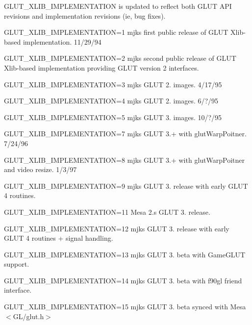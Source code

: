 G\+L\+U\+T\+\_\+\+X\+L\+I\+B\+\_\+\+I\+M\+P\+L\+E\+M\+E\+N\+T\+A\+T\+I\+ON is updated to reflect both G\+L\+UT A\+PI revisions and implementation revisions (ie, bug fixes).

G\+L\+U\+T\+\_\+\+X\+L\+I\+B\+\_\+\+I\+M\+P\+L\+E\+M\+E\+N\+T\+A\+T\+I\+ON=1 mjk\textquotesingle{}s first public release of G\+L\+UT Xlib-\/based implementation. 11/29/94

G\+L\+U\+T\+\_\+\+X\+L\+I\+B\+\_\+\+I\+M\+P\+L\+E\+M\+E\+N\+T\+A\+T\+I\+ON=2 mjk\textquotesingle{}s second public release of G\+L\+UT Xlib-\/based implementation providing G\+L\+UT version 2 interfaces.

G\+L\+U\+T\+\_\+\+X\+L\+I\+B\+\_\+\+I\+M\+P\+L\+E\+M\+E\+N\+T\+A\+T\+I\+ON=3 mjk\textquotesingle{}s G\+L\+UT 2. images. 4/17/95

G\+L\+U\+T\+\_\+\+X\+L\+I\+B\+\_\+\+I\+M\+P\+L\+E\+M\+E\+N\+T\+A\+T\+I\+ON=4 mjk\textquotesingle{}s G\+L\+UT 2. images. 6/?/95

G\+L\+U\+T\+\_\+\+X\+L\+I\+B\+\_\+\+I\+M\+P\+L\+E\+M\+E\+N\+T\+A\+T\+I\+ON=5 mjk\textquotesingle{}s G\+L\+UT 3. images. 10/?/95

G\+L\+U\+T\+\_\+\+X\+L\+I\+B\+\_\+\+I\+M\+P\+L\+E\+M\+E\+N\+T\+A\+T\+I\+ON=7 mjk\textquotesingle{}s G\+L\+UT 3.+ with glut\+Warp\+Poitner. 7/24/96

G\+L\+U\+T\+\_\+\+X\+L\+I\+B\+\_\+\+I\+M\+P\+L\+E\+M\+E\+N\+T\+A\+T\+I\+ON=8 mjk\textquotesingle{}s G\+L\+UT 3.+ with glut\+Warp\+Poitner and video resize. 1/3/97

G\+L\+U\+T\+\_\+\+X\+L\+I\+B\+\_\+\+I\+M\+P\+L\+E\+M\+E\+N\+T\+A\+T\+I\+ON=9 mjk\textquotesingle{}s G\+L\+UT 3. release with early G\+L\+UT 4 routines.

G\+L\+U\+T\+\_\+\+X\+L\+I\+B\+\_\+\+I\+M\+P\+L\+E\+M\+E\+N\+T\+A\+T\+I\+ON=11 Mesa 2.\textquotesingle{}s G\+L\+UT 3. release.

G\+L\+U\+T\+\_\+\+X\+L\+I\+B\+\_\+\+I\+M\+P\+L\+E\+M\+E\+N\+T\+A\+T\+I\+ON=12 mjk\textquotesingle{}s G\+L\+UT 3. release with early G\+L\+UT 4 routines + signal handling.

G\+L\+U\+T\+\_\+\+X\+L\+I\+B\+\_\+\+I\+M\+P\+L\+E\+M\+E\+N\+T\+A\+T\+I\+ON=13 mjk\textquotesingle{}s G\+L\+UT 3. beta with Game\+G\+L\+UT support.

G\+L\+U\+T\+\_\+\+X\+L\+I\+B\+\_\+\+I\+M\+P\+L\+E\+M\+E\+N\+T\+A\+T\+I\+ON=14 mjk\textquotesingle{}s G\+L\+UT 3. beta with f90gl friend interface.

G\+L\+U\+T\+\_\+\+X\+L\+I\+B\+\_\+\+I\+M\+P\+L\+E\+M\+E\+N\+T\+A\+T\+I\+ON=15 mjk\textquotesingle{}s G\+L\+UT 3. beta sync\textquotesingle{}ed with Mesa $<$G\+L/glut.\+h$>$ 
